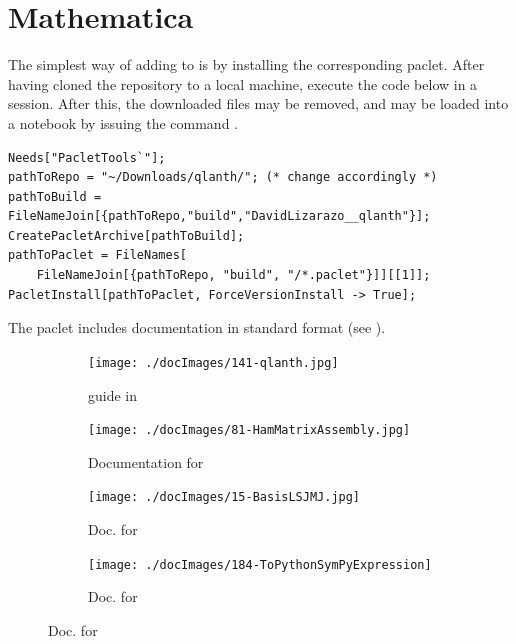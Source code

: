 \documentclass[11pt, twoside,openright]{article}
\begin{document}
\section{Mathematica }

The simplest way of adding \qlanth to \mathematica is by installing the corresponding paclet. After having cloned the repository to a local machine, execute the code below in a \mathematica session. After this, the downloaded files may be removed, and \qlanth may be loaded into a notebook by issuing the command  .

\begin{verbatim}
Needs["PacletTools`"];
pathToRepo = "~/Downloads/qlanth/"; (* change accordingly *)
pathToBuild = FileNameJoin[{pathToRepo,"build","DavidLizarazo__qlanth"}];
CreatePacletArchive[pathToBuild];
pathToPaclet = FileNames[
	FileNameJoin[{pathToRepo, "build", "/*.paclet"}]][[1]];
PacletInstall[pathToPaclet, ForceVersionInstall -> True];
\end{verbatim}

The paclet includes documentation in standard \mathematica format (see ).

\begin{figure}
	\centering
	\begin{subfigure}{0.45\textwidth}
        \centering
		\texttt{[image: ./docImages/141-qlanth.jpg]}	
		\caption{\qlanth guide in \mathematica}
		\label{fig:mathematica-docs}
    \end{subfigure}
	\begin{subfigure}{0.45\textwidth}
        \centering
		\texttt{[image: ./docImages/81-HamMatrixAssembly.jpg]}	
		\caption{Documentation for }
		\label{fig:mathematica-docs-hammatrix}
    \end{subfigure}
    
    \vspace{1cm} 
    
	\begin{subfigure}{0.45\textwidth}
        \centering
		\texttt{[image: ./docImages/15-BasisLSJMJ.jpg]}	
		\caption{Doc. for }
		\label{fig:mathematica-docs-basislsjmj}
    \end{subfigure}
	\begin{subfigure}{0.45\textwidth}
        \centering
		\texttt{[image: ./docImages/184-ToPythonSymPyExpression]}	
		\caption{Doc. for }
		\label{fig:mathematica-docs2}
    \end{subfigure}
\end{figure}
\end{document}

